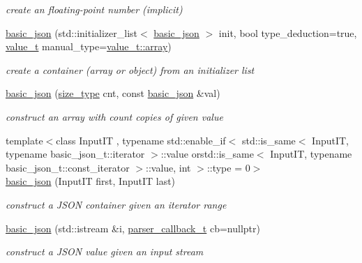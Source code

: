 \begin{DoxyCompactItemize}
\begin{DoxyCompactList}\small\item\em create an floating-\/point number (implicit) \end{DoxyCompactList}\item 
\hyperlink{classnlohmann_1_1basic__json_afeb998aec45296bc2050bd1c41ef41eb}{basic\-\_\-json} (std\-::initializer\-\_\-list$<$ \hyperlink{classnlohmann_1_1basic__json}{basic\-\_\-json} $>$ init, bool type\-\_\-deduction=true, \hyperlink{classnlohmann_1_1basic__json_a231b02148577b69a154b2ce2c87a5522}{value\-\_\-t} manual\-\_\-type=\hyperlink{classnlohmann_1_1basic__json_a231b02148577b69a154b2ce2c87a5522af1f713c9e000f5d3f280adbd124df4f5}{value\-\_\-t\-::array})
\begin{DoxyCompactList}\small\item\em create a container (array or object) from an initializer list \end{DoxyCompactList}\item 
\hyperlink{classnlohmann_1_1basic__json_a112a2d8e76345ea64f71e2985fee4c52}{basic\-\_\-json} (\hyperlink{classnlohmann_1_1basic__json_a1579a8f72a230358d6cd1a6e8a62859b}{size\-\_\-type} cnt, const \hyperlink{classnlohmann_1_1basic__json}{basic\-\_\-json} \&val)
\begin{DoxyCompactList}\small\item\em construct an array with count copies of given value \end{DoxyCompactList}\item 
{\footnotesize template$<$class Input\-I\-T , typename std\-::enable\-\_\-if$<$ std\-::is\-\_\-same$<$ Input\-I\-T, typename basic\-\_\-json\-\_\-t\-::iterator $>$\-::value orstd\-::is\-\_\-same$<$ Input\-I\-T, typename basic\-\_\-json\-\_\-t\-::const\-\_\-iterator $>$\-::value, int $>$\-::type  = 0$>$ }\\\hyperlink{classnlohmann_1_1basic__json_af7acf3838a79363356f24538941a559c}{basic\-\_\-json} (Input\-I\-T first, Input\-I\-T last)
\begin{DoxyCompactList}\small\item\em construct a J\-S\-O\-N container given an iterator range \end{DoxyCompactList}\item 
\hyperlink{classnlohmann_1_1basic__json_a9857835334d38ba04959e348ca6be208}{basic\-\_\-json} (std\-::istream \&i, \hyperlink{classnlohmann_1_1basic__json_a9e35475e2027520a78e09f460dbe048a}{parser\-\_\-callback\-\_\-t} cb=nullptr)
\begin{DoxyCompactList}\small\item\em construct a J\-S\-O\-N value given an input stream \end{DoxyCompactList}\item 

\end{DoxyCompactItemize}
